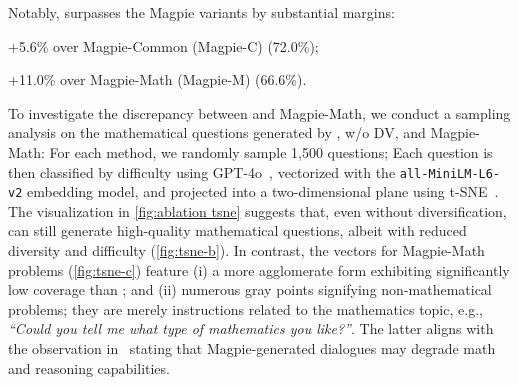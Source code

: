 Notably, {\langname} surpasses the Magpie variants by substantial margins: 
\begin{enumerate*}[label=(\roman*)]
    \item +5.6\% over Magpie-Common (Magpie-C) (72.0\%);
    \item +11.0\% over Magpie-Math (Magpie-M) (66.6\%).
\end{enumerate*}

To investigate the discrepancy between {\langname} and Magpie-Math, we conduct a sampling analysis on the mathematical questions generated by {\langname}, {\langname} w/o DV, and Magpie-Math: For each method, we randomly sample 1,500 questions; Each question is then classified by difficulty using GPT-4o~\cite{DBLP:journals/corr/abs-2410-21276}, vectorized with the \texttt{all-MiniLM-L6-v2} embedding model, and projected into a two-dimensional plane using t-SNE~\cite{van2008visualizing}. The visualization in \cref{fig:ablation tsne} suggests that,
even without diversification, {\langname} can still generate high-quality mathematical questions, albeit with reduced diversity and difficulty (\cref{fig:tsne-b}). In contrast, the vectors for Magpie-Math problems (\cref{fig:tsne-c}) feature (i) a more agglomerate form exhibiting significantly low coverage than {\langname}; and (ii) numerous gray points signifying non-mathematical problems; they are merely instructions related to the mathematics topic, e.g., \emph{\enquote{Could you tell me what type of mathematics you like?}}. The latter aligns with the observation in~\cite[Sect.~6]{DBLP:journals/corr/abs-2406-08464} stating that Magpie-generated dialogues may degrade math and reasoning capabilities. 


